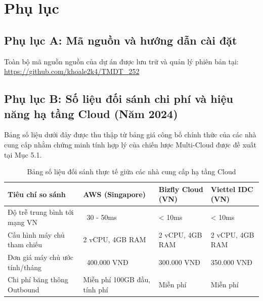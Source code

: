 \section*{Phụ lục}

\subsection*{Phụ lục A: Mã nguồn và hướng dẫn cài đặt}
Toàn bộ mã nguồn nguồn của dự án được lưu trữ và quản lý phiên bản tại: \\
\url{https://github.com/khoale2k4/TMDT_252} 

\subsection*{Phụ lục B: Số liệu đối sánh chi phí và hiệu năng hạ tầng Cloud (Năm 2024)}
Bảng số liệu dưới đây được thu thập từ bảng giá công bố chính thức của các nhà cung cấp nhằm chứng minh tính hợp lý của chiến lược Multi-Cloud được đề xuất tại Mục 5.1.

\begin{table}[H]
    \centering
    \renewcommand{\arraystretch}{1.3}
    \begin{tabularx}{\textwidth}{|p{4.5cm}|X|X|X|}
    \hline
    \textbf{Tiêu chí so sánh} & \textbf{AWS (Singapore) \cite{ref:aws}} & \textbf{Bizfly Cloud (VN) \cite{ref:bizfly}} & \textbf{Viettel IDC (VN) \cite{ref:viettel}} \\ \hline
    Độ trễ trung bình tới mạng VN & ~30 - 50ms & < 10ms & < 10ms \\ \hline
    Cấu hình máy chủ tham chiếu & 2 vCPU, 4GB RAM & 2 vCPU, 4GB RAM & 2 vCPU, 4GB RAM \\ \hline
    Đơn giá máy chủ ước tính/tháng & ~400.000 VNĐ & 300.000 VNĐ & 350.000 VNĐ \\ \hline
    Chi phí băng thông Outbound & Miễn phí 100GB đầu, tính phí & Miễn phí & Miễn phí \\ \hline
    \end{tabularx}
    \caption{Bảng số liệu đối sánh thực tế giữa các nhà cung cấp hạ tầng Cloud}
    \label{tab:appendix_cloud_stats_v2}
\end{table}